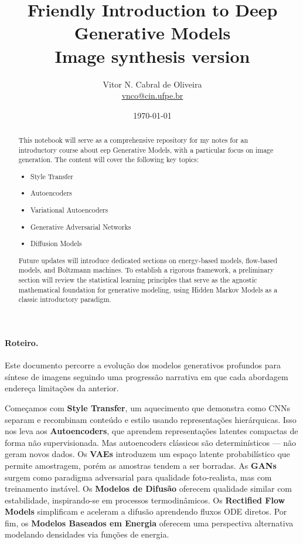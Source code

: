 \documentclass{tufte-handout}
\title{Friendly Introduction to Deep Generative Models\\
Image synthesis version}
\author{Vitor N. Cabral de Oliveira\\ \href{mailto:vnco@cin.ufpe.br}{vnco@cin.ufpe.br}}
\date{\today}
\begin{document}
\maketitle

\begin{abstract}
   This notebook will serve as a comprehensive repository for my notes for an introductory course about 
   eep Generative Models, with a particular focus on image generation. 
   The content will cover the following key topics:
    \begin{itemize}
    \item Style Transfer
    \item Autoencoders
    \item Variational Autoencoders
    \item Generative Adversarial Networks
    \item Diffusion Models
   \end{itemize}
   Future updates will introduce dedicated sections on energy-based models, flow-based models, and Boltzmann machines. 
   To establish a rigorous framework, a preliminary section will review the statistical learning principles that serve as the agnostic 
   mathematical foundation for generative modeling, using Hidden Markov Models as a classic introductory paradigm.
\end{abstract}

\newpage
\hypersetup{linkcolor=wp-text}
\tableofcontents
\hypersetup{linkcolor=wp-primary}
\newpage

\paragraph{Roteiro.}
Este documento percorre a evolução dos modelos generativos profundos para síntese de imagens seguindo uma progressão narrativa em que cada abordagem endereça limitações da anterior.

Começamos com \textbf{Style Transfer}, um aquecimento que demonstra como CNNs separam e recombinam conteúdo e estilo usando representações hierárquicas. Isso nos leva aos \textbf{Autoencoders}, que aprendem representações latentes compactas de forma não supervisionada. Mas autoencoders clássicos são determinísticos --- não geram novos dados. Os \textbf{VAEs} introduzem um espaço latente probabilístico que permite amostragem, porém as amostras tendem a ser borradas. As \textbf{GANs} surgem como paradigma adversarial para qualidade foto-realista, mas com treinamento instável. Os \textbf{Modelos de Difusão} oferecem qualidade similar com estabilidade, inspirando-se em processos termodinâmicos. Os \textbf{Rectified Flow Models} simplificam e aceleram a difusão aprendendo fluxos ODE diretos. Por fim, os \textbf{Modelos Baseados em Energia} oferecem uma perspectiva alternativa modelando densidades via funções de energia.
\end{document}
